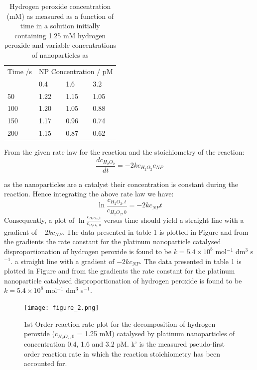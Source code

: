 \documentclass[	DIV=calc,%
							paper=a4,%
							fontsize=11pt,%
							twocolumn]{scrartcl}	 					%
\begin{document}
\begin{table}[h]
    \begin{tabular}{l|lll}
        Time /s & \multicolumn{3}{l}{NP Concentration / pM} \\
         & 0.4 & 1.6 & 3.2 \\
         \hline
         50 & 1.22 & 1.15 & 1.05 \\
         100 & 1.20 & 1.05 & 0.88 \\
         150 & 1.17 & 0.96 & 0.74 \\
         200 & 1.15 & 0.87 & 0.62
    \end{tabular}
    \captionsetup{format=plain}
    \caption{Hydrogen peroxide concentration (mM) as measured as a function of time in a solution initially containing 1.25 mM hydrogen peroxide and variable concentrations of nanoparticles as } 
    \label{H2O2vals}
\end{table}
From the given rate law for the reaction and the stoichiometry of the reaction:
\begin{equation}
    \frac{d c_{H_2O_2}}{dt} = -2kc_{H_2O_2}c_{NP}
\end{equation}

\noindent as the nanoparticles are a catalyst their concentration is constant during the reaction. Hence integrating the above rate law we have:
\begin{equation}
    \ln{\frac{c_{H_2O_2,t}}{c_{H_2O_2,0}}} = -2kc_{NP}t
\end{equation}
Consequently, a plot of $\ln{\frac{c_{H_2O_2,t}}{c_{H_2O_2,0}}}$ versus time should yield a straight line with a gradient of $-2kc_{NP}$. The data presented in table 1 is plotted in Figure and from the gradients the rate constant for the platinum nanoparticle catalysed disproportionation of hydrogen peroxide is found to be $k = 5.4 \times 10^8$ mol$^{-1}$ dm$^{3}$ s$^{-1}$.
 a straight line with a gradient of $-2kc_{NP}$. The data presented in table 1 is plotted in Figure and from the gradients the rate constant for the platinum nanoparticle catalysed disproportionation of hydrogen peroxide is found to be $k = 5.4 \times 10^8$ mol$^{-1}$ dm$^{3}$ s$^{-1}$.
\begin{figure}
    \centering
    \texttt{[image: figure\_2.png]}
    \captionsetup{format=plain}
    \caption{1st Order reaction rate plot for the decomposition of hydrogen peroxide (c$_{{H_2O_2},0}$ = 1.25 mM) catalysed by platinum nanoparticles of concentration 0.4, 1.6 and 3.2 pM. k' is the measured pseudo-first order reaction rate in which the reaction stoichiometry has been accounted for.}
    \label{fig:rate}
\end{figure}
\end{document}
